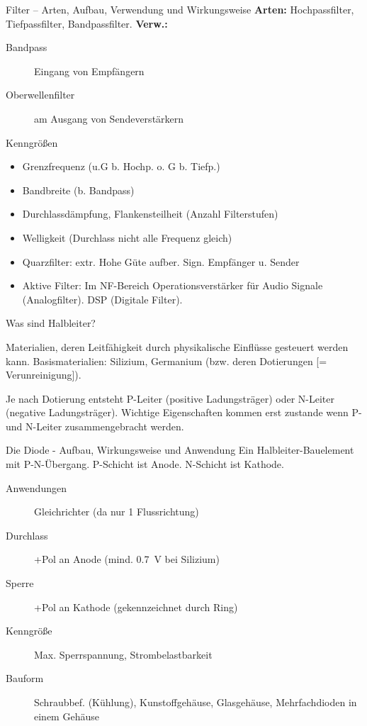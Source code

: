 \documentclass[avery5371,grid,frame,a4paper]{flashcards}
\newcommand{\card}[3]{
  \begin{flashcard}[{\chap} -- #1]{#2}#3\end{flashcard}
}
\begin{document}
\card{21}{Filter – Arten, Aufbau, Verwendung und Wirkungsweise}{
  \footnotesize
  \textbf{Arten:} Hochpassfilter, Tiefpassfilter, Bandpassfilter.
  \textbf{Verw.:}

  \begin{description}
    \item[Bandpass] Eingang von Empfängern
    \item[Oberwellenfilter] am Ausgang von Sendeverstärkern
    \item[Kenngrößen]
  \end{description}
  {
    \scriptsize
      \begin{minipage}{0.5\textwidth}
        \begin{itemize}\itemsep0pt
          \item Grenzfrequenz (u.G b. Hochp. o. G b. Tiefp.)  %
          \item Bandbreite (b. Bandpass)
          \item Durchlassdämpfung, Flankensteilheit (Anzahl Filterstufen)
          \item Welligkeit (Durchlass nicht alle Frequenz gleich)
        \end{itemize}
      \end{minipage}
      \begin{minipage}{0.47\textwidth}
        \begin{itemize}\itemsep0pt
          \item Quarzfilter: extr. Hohe Güte aufber. Sign. Empfänger u. Sender
          \item Aktive Filter: Im NF-Bereich Operationsverstärker für Audio Signale (Analogfilter).
            DSP (Digitale Filter).
        \end{itemize}
      \end{minipage}
  }
}
\card{22}{Was sind Halbleiter?}{
  \item
  Materialien, deren Leitfähigkeit durch physikalische Einflüsse gesteuert werden kann.
  Basismaterialien: Silizium, Germanium (bzw. deren Dotierungen [= Verunreinigung]).

  \item
  Je nach Dotierung entsteht P-Leiter (positive Ladungsträger) oder N-Leiter (negative Ladungsträger).
  Wichtige Eigenschaften kommen erst zustande  wenn P- und N-Leiter zusammengebracht werden.
}
\card{23}{Die Diode - Aufbau, Wirkungsweise und Anwendung}{
  \small
  Ein Halbleiter-Bauelement mit P-N-Übergang.
  P-Schicht ist Anode. N-Schicht ist Kathode.
  \begin{description}
    \item[Anwendungen] Gleichrichter (da nur 1 Flussrichtung)
    \item[Durchlass] +Pol an Anode (mind. \SI{0,7}{\volt} bei Silizium)
    \item[Sperre] +Pol an Kathode (gekennzeichnet durch Ring)
    \item[Kenngröße] Max. Sperrspannung, Strombelastbarkeit
    \item[Bauform] Schraubbef. (Kühlung), Kunstoffgehäuse, Glasgehäuse, Mehrfachdioden in einem Gehäuse
  \end{description}
}
\end{document}
